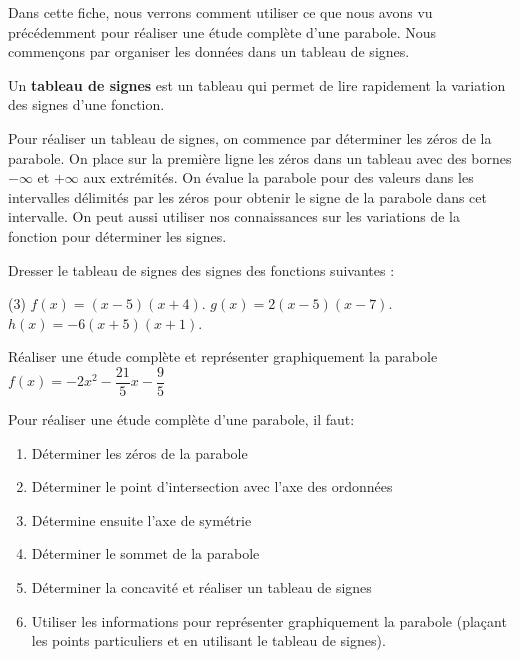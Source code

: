 \documentclass[a4paper,12pt]{report}
\begin{document}
 Dans cette fiche, nous verrons comment utiliser ce que nous avons vu précédemment pour réaliser une étude complète d'une parabole. Nous commençons par organiser les données dans un tableau de signes.

 \begin{defi}
	 Un {\bfseries tableau de signes} est un tableau qui permet de lire rapidement la variation des signes d'une fonction.
 \end{defi}
        
 \begin{rem}
	 Pour réaliser un tableau de signes, on commence par déterminer les zéros de la parabole. On place sur la première ligne les zéros dans un tableau avec des bornes $-\infty$ et $+\infty$ aux extrémités. On évalue la parabole pour des valeurs dans les intervalles délimités par les zéros pour obtenir le signe de la parabole dans cet intervalle. On peut aussi utiliser nos connaissances sur les variations de la fonction pour déterminer les signes.
 \end{rem}
 
 
\begin{boiteExT}[Tableau de signes de la parabole $f(x)=x^2-3x+2$]
	\vspace{8cm}
\end{boiteExT}

\begin{exo}
	Dresser le tableau de signes des signes des fonctions suivantes :
	\begin{tasks}(3)
	\task $f(x)=(x-5)(x+4)$.
 \task $g(x)=2(x-5)(x-7)$.
 \task $h(x)=-6(x+5)(x+1)$.
	\end{tasks}
\end{exo}
	\begin{exo}
		Réaliser une étude complète et représenter graphiquement la parabole $f(x)=-2 x^2-\dfrac{21}{5} x-\dfrac{9}{5}$
	\end{exo}
\newpage
   \begin{rem}
   Pour réaliser une étude complète d'une parabole, il faut:
   \begin{enumerate}
	   \item Déterminer les zéros de la parabole
\item Déterminer le point d'intersection avec l'axe des ordonnées
\item Détermine ensuite l'axe de symétrie
\item Déterminer le sommet de la parabole
\item Déterminer la concavité et réaliser un tableau de signes
\item Utiliser les informations pour représenter graphiquement la parabole (plaçant les points particuliers et en utilisant le tableau de signes).
\end{enumerate}
   \end{rem}
 
\end{document}
